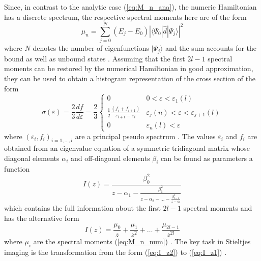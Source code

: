Since, in contrast to the analytic case (\ref{eq:M_n_ana}), the numeric Hamiltonian has a discrete spectrum, the respective spectral moments here are of the form
\begin{equation} \label{eq:M_n_num}
      \mu_n= \sum_{j=0}^N (E_j-E_0) \left| \langle \Psi_0 | \hat{d}| \Psi_j\rangle \right|^2
\end{equation}
where $N$ denotes the number of eigenfunctions $|\Psi_j\rangle$ and the sum accounts for the bound as well as unbound states \cite{stieltjeLanczos,stieltjesCeder}.
Assuming that the first $2l-1$ spectral moments can be restored by the numerical Hamiltonian in good approximation, they can be used to obtain a histogram representation of the cross section of the form
\begin{equation}
\sigma(\varepsilon)=\frac 23 \frac{df}{d\varepsilon}
      =\frac 23 \begin{cases} 0 & 0< \varepsilon <\varepsilon_1(l) \\
      \frac 12 \frac{(f_i+f_{i+1})}{\varepsilon_{i+1}-\varepsilon_i}  & \varepsilon_j(n)<\varepsilon<\varepsilon_{j+1}(l)\\
      0   & \varepsilon_n(l)<\varepsilon \end{cases}
\end{equation}
where $(\varepsilon_i,f_i)_{i=1,...,l}$ are a principal pseudo spectrum \cite{stieltjeLanczos}. 
The values $\varepsilon_i$ and $f_i$ are obtained from an eigenvalue equation of a symmetric tridiagonal matrix whose diagonal elements $\alpha_i$ and off-diagonal elements $\beta_i$ can be found as parameters a function 
\begin{equation}\label{eq:I_z1}
I(z)=\frac{\beta_0^2}{z-\alpha_1-\frac{\beta_1^2}{z-\alpha_2-\hdots-\frac{\beta_{l-1}^2}{z-a_l}}}
\end{equation}
which contains the full information about the first $2l-1$ spectral moments and has the alternative form \cite{nesbet}
\begin{equation} \label{eq:I_z2}
I(z)=\frac{\mu_0}{z}+\frac{\mu_1}{z^2}+\hdots+\frac{\mu_{2l-1}}{z^{2l}}
\end{equation}
where $\mu_i$ are the spectral moments (\ref{eq:M_n_num}) \cite{nesbet}.
The key task in Stieltjes imaging is the transformation from the form (\ref{eq:I_z2}) to (\ref{eq:I_z1}) \cite{nesbet}.

